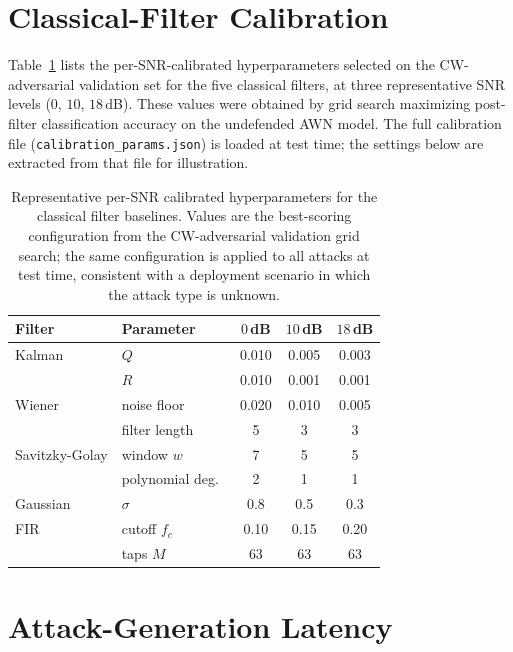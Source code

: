 \section{Classical-Filter Calibration}
\label{app:calibration}

Table~\ref{tab:calibration} lists the per-SNR-calibrated hyperparameters
selected on the CW-adversarial validation set for the five classical
filters, at three representative SNR levels ($0$, $10$, $18$\,dB). These
values were obtained by grid search maximizing post-filter classification
accuracy on the undefended AWN model. The full calibration file
(\texttt{calibration\_params.json}) is loaded at test time; the settings
below are extracted from that file for illustration.

\begin{table}[!ht]
\caption{Representative per-SNR calibrated hyperparameters for the
  classical filter baselines. Values are the best-scoring configuration
  from the CW-adversarial validation grid search; the same
  configuration is applied to all attacks at test time, consistent
  with a deployment scenario in which the attack type is unknown.}
\label{tab:calibration}
\centering
\small
\begin{tabular}{llccc}
\toprule
Filter & Parameter & $0$\,dB & $10$\,dB & $18$\,dB \\
\midrule
Kalman         & $Q$              & 0.010 & 0.005 & 0.003 \\
               & $R$              & 0.010 & 0.001 & 0.001 \\
Wiener         & noise floor      & 0.020 & 0.010 & 0.005 \\
               & filter length    & 5     & 3     & 3     \\
Savitzky-Golay & window $w$       & 7     & 5     & 5     \\
               & polynomial deg.\ & 2     & 1     & 1     \\
Gaussian       & $\sigma$         & 0.8   & 0.5   & 0.3   \\
FIR            & cutoff $f_c$     & 0.10  & 0.15  & 0.20  \\
               & taps $M$         & 63    & 63    & 63    \\
\bottomrule
\end{tabular}
\end{table}

\section{Attack-Generation Latency}
\label{app:attack_latency}

